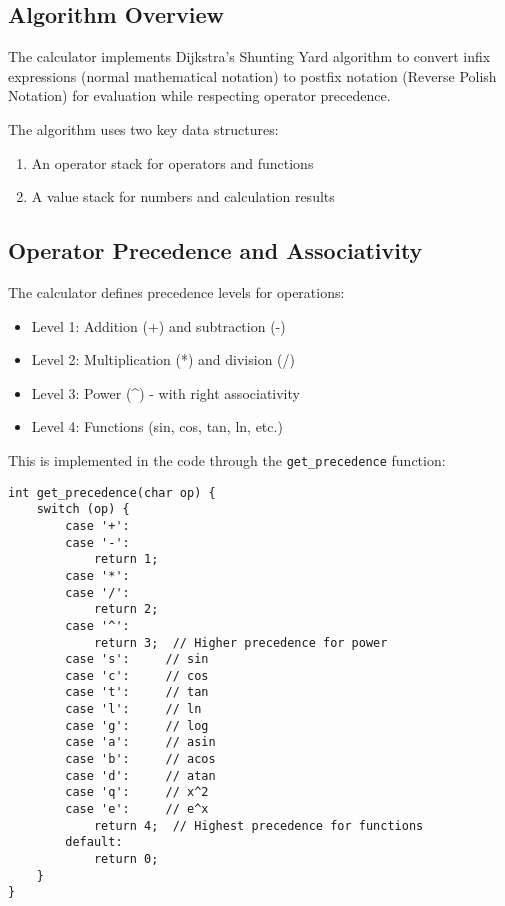 \documentclass[12pt,a4paper]{article}
\begin{document}
\subsection{Algorithm Overview}

The calculator implements Dijkstra's Shunting Yard algorithm to convert infix expressions (normal mathematical notation) to postfix notation (Reverse Polish Notation) for evaluation while respecting operator precedence.

The algorithm uses two key data structures:
\begin{enumerate}
    \item An operator stack for operators and functions
    \item A value stack for numbers and calculation results
\end{enumerate}

\subsection{Operator Precedence and Associativity}

The calculator defines precedence levels for operations:

\begin{itemize}
    \item Level 1: Addition (+) and subtraction (-)
    \item Level 2: Multiplication (*) and division (/)
    \item Level 3: Power (\^{}) - with right associativity
    \item Level 4: Functions (sin, cos, tan, ln, etc.)
\end{itemize}

This is implemented in the code through the \texttt{get\_precedence} function:

\begin{lstlisting}
int get_precedence(char op) {
    switch (op) {
        case '+':
        case '-':
            return 1;
        case '*':
        case '/':
            return 2;
        case '^':
            return 3;  // Higher precedence for power
        case 's':     // sin
        case 'c':     // cos
        case 't':     // tan
        case 'l':     // ln
        case 'g':     // log
        case 'a':     // asin
        case 'b':     // acos
        case 'd':     // atan
        case 'q':     // x^2
        case 'e':     // e^x
            return 4;  // Highest precedence for functions
        default:
            return 0;
    }
}
\end{lstlisting}
\end{document}
